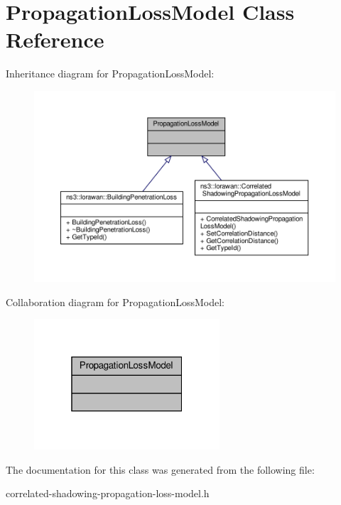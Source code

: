 \hypertarget{classPropagationLossModel}{}\section{Propagation\+Loss\+Model Class Reference}
\label{classPropagationLossModel}


Inheritance diagram for Propagation\+Loss\+Model\+:
\nopagebreak
\begin{figure}[H]
\begin{center}
\leavevmode
\includegraphics[width=350pt]{classPropagationLossModel__inherit__graph}
\end{center}
\end{figure}


Collaboration diagram for Propagation\+Loss\+Model\+:
\nopagebreak
\begin{figure}[H]
\begin{center}
\leavevmode
\includegraphics[width=196pt]{classPropagationLossModel__coll__graph}
\end{center}
\end{figure}


The documentation for this class was generated from the following file\+:\begin{DoxyCompactItemize}
\item 
correlated-\/shadowing-\/propagation-\/loss-\/model.\+h\end{DoxyCompactItemize}
